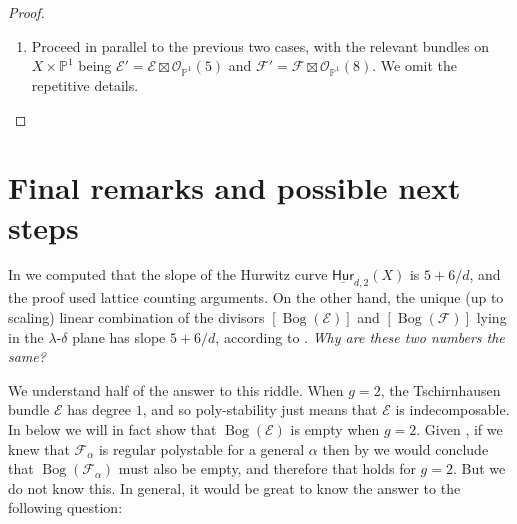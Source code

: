 \documentclass[reqno, 11pt]{amsart}
\renewcommand{\P}{\mathbb{P}}
\renewcommand{\O}{\mathcal{O}}
\DeclareMathOperator{\Sym}{Sym}
\DeclareMathOperator{\Bog}{Bog}
\newcommand{\Hurfixed}[2]{\underline{\mathsf{Hur}}_{#1,#2}}
\newcommand{\Hurfixedstable}[2]{\underline{\mathsf{Hur}}_{#1,#2}^{\diamond}}
\begin{document}
\begin{proof}
\begin{enumerate}
        The large $g$ condition ensures $\Sym^{2} \mathcal{E}' \otimes (\mathcal{F}')^{\vee}$ is globally generated. By Casnati and Ekedahl's Bertini-type theorems \cite{casnatiekedahlI,casnati1996covers}, $t$ defines a smooth surface $S \subset \P \mathcal{E}'$, which is a degree $4$ branched cover of $X \times B$ with Tschirnhausen bundle $\mathcal{E}'$. The morphism $S \to B$ gives a family of arithmetic genus $g$ curves with smooth general fiber.

        The positivity of $\Sym^{2}\mathcal{E} \otimes \mathcal{F}^{\vee}$ implies that the locus of elements in its projectivization defining worse-than-nodal curves has codimension at least $2$. So $B$ can be made to avoid this locus, and therefore $B$ defines a moving curve in $\Hurfixedstable{4}{g}(X)$.

        \item Proceed in parallel to the previous two cases, with the relevant bundles on $X \times \P^{1}$ being $\mathcal{E}' = \mathcal{E} \boxtimes \O_{\P^{1}}(5)$ and $\mathcal{F}' = \mathcal{F} \boxtimes \O_{\P^{1}}(8)$. We omit the repetitive details.
    \end{enumerate}
\end{proof}


\section{Final remarks and possible next steps} 

In  we computed that the slope of the Hurwitz curve $\Hurfixed{d}{2}(X)$ is $5+6/d$, and the proof used lattice counting arguments.  On the other hand, the unique (up to scaling) linear combination of the divisors $[\Bog(\mathcal{E})]$ and $[\Bog(\mathcal{F})]$ lying in the $\lambda$-$\delta$ plane has slope $5+6/d$, according to .  {\sl Why are these two numbers the same?}

We understand half of the answer to this riddle.  When $g=2$, the Tschirnhausen bundle $\mathcal{E}$ has degree $1$, and so poly-stability just means that $\mathcal{E}$ is indecomposable.  In  below we will in fact show that $\Bog(\mathcal{E})$ is empty when $g = 2$.  Given , if we knew that $\mathcal{F}_{\alpha}$ is regular polystable for a general $\alpha$ then by  we would conclude that $\Bog(\mathcal{F_{\alpha}})$ must also be empty, and therefore that  holds for $g=2$. But we do not know this. In general, it would be great to know the answer to the following question: 
\end{document}
